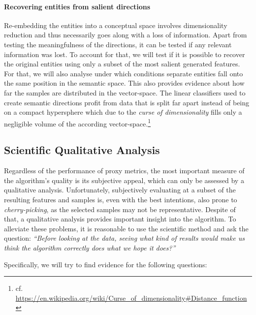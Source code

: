 \paragraph{Recovering entities from salient directions} Re-embedding the entities into a conceptual space involves dimensionality reduction and thus necessarily goes along with a loss of information. Apart from testing the meaningfulness of the directions, it can be tested if any relevant information was lost. To account for that, we will test if it is possible to recover the original entities using only a subset of the most salient generated features. For that, we will also analyse under which conditions separate entities fall onto the same position in the semantic space. This also provides evidence about how far the samples are distributed in the vector-space. The linear classifiers used to create semantic directions profit from data that is split far apart instead of being on a compact hypersphere which due to the \textit{curse of dimensionality} fills only a negligible volume of the according vector-space.\footnote{cf. \url{https://en.wikipedia.org/wiki/Curse_of_dimensionality\#Distance_function}}

\subsection{Scientific Qualitative Analysis}
\label{sec:pre_qual_an}

Regardless of the performance of proxy metrics, the most important measure of the algorithm's quality is its subjective appeal, which can only be assessed by a qualitative analysis. Unfortunately, subjectively evaluating at a subset of the resulting features and samples is, even with the best intentions, also prone to  \textit{cherry-picking}, as the selected samples may not be representative. Despite of that, a qualitative analysis provides important insight into the algorithm. To alleviate these problems, it is reasonable to use the scientific method and ask the question: \textit{``Before looking at the data, seeing what kind of results would make us think the algorithm correctly does what we hope it does?''}

Specifically, we will try to find evidence for the following questions:

